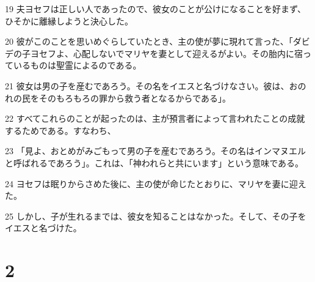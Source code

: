\par 19 夫ヨセフは正しい人であったので、彼女のことが公けになることを好まず、ひそかに離縁しようと決心した。
\par 20 彼がこのことを思いめぐらしていたとき、主の使が夢に現れて言った、「ダビデの子ヨセフよ、心配しないでマリヤを妻として迎えるがよい。その胎内に宿っているものは聖霊によるのである。
\par 21 彼女は男の子を産むであろう。その名をイエスと名づけなさい。彼は、おのれの民をそのもろもろの罪から救う者となるからである」。
\par 22 すべてこれらのことが起ったのは、主が預言者によって言われたことの成就するためである。すなわち、
\par 23 「見よ、おとめがみごもって男の子を産むであろう。その名はインマヌエルと呼ばれるであろう」。これは、「神われらと共にいます」という意味である。
\par 24 ヨセフは眠りからさめた後に、主の使が命じたとおりに、マリヤを妻に迎えた。
\par 25 しかし、子が生れるまでは、彼女を知ることはなかった。そして、その子をイエスと名づけた。

\chapter{2}

